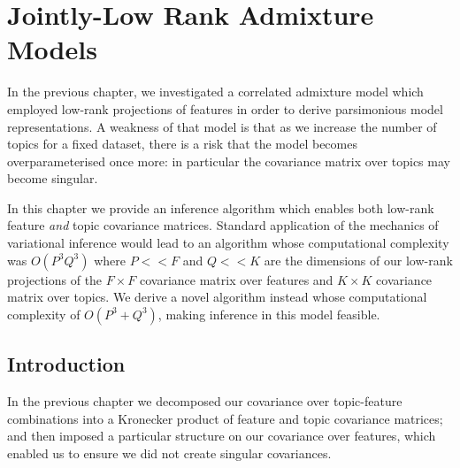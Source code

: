 %
\newcommand{\lm}[1] {
	#1^{\setminus m}
}

\newcommand \model[0] {
    \mathcal{M}
}

\newcommand \perplexity[1] {
    \mathcal{P} \left( { #1 } \right)
}

\newcommand \WTrain {
    \mathcal{W}^{(t)}
}

\newcommand \WQuery {
    \mathcal{W}^{(q)}
}

\newcommand \oneover[1] {
    \frac{1}{ {#1} }
}

\newcommand \samp[1] {
    { #1 }^{(s)}
}

\newcommand \etd[0] {
    \vv{\eta}_d
}

\newcommand \Ed {{ \vv{\xi}_d}}
\newcommand \Edj {{\xi_{dj}}}
\newcommand \Edk {{\xi_{dk}}}
\newcommand \AEdj {{\Lambda(\xi_{dj})}}
\newcommand \AEdk {{\Lambda(\xi_{dk})}}
\newcommand \AEd  {{ \bm{\Lambda}(\bm{\xi}_d) }}

\newcommand \Axi { { \Lambda_{\xi} } }
\newcommand \bxi { { \vv{b}_{\xi} } }
\newcommand \cxi { { c_{\xi} } }

\chapter{Jointly-Low Rank Admixture Models}
In the previous chapter, we investigated a correlated admixture model which employed low-rank projections of features in order to derive parsimonious model representations. A weakness of that model is that as we increase the number of topics for a fixed dataset, there is a risk that the model becomes overparameterised once more: in particular the covariance matrix over topics may become singular.

In this chapter we provide an inference algorithm which enables both low-rank feature \emph{and} topic covariance matrices. Standard application of the mechanics of variational inference would lead to an algorithm whose computational complexity was $O(P^3Q^3)$ where $P << F$ and $Q << K$ are the dimensions of our low-rank projections of the $F\times F$ covariance matrix over features and $K \times K$ covariance matrix over topics. We derive a novel algorithm instead whose computational complexity of $O(P^3 + Q^3)$, making inference in this model feasible.

\section{Introduction}
In the previous chapter we decomposed our covariance over topic-feature combinations into a Kronecker product of feature and topic covariance matrices; and then imposed a particular structure on our covariance over features, which enabled us to ensure we did not create singular covariances.

